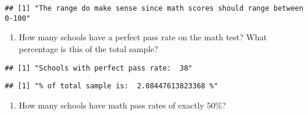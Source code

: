 \documentclass[]{article}
\newenvironment{Shaded}{\begin{snugshade}}{\end{snugshade}}
\newcommand{\KeywordTok}[1]{\textcolor[rgb]{0.13,0.29,0.53}{\textbf{#1}}}
\newcommand{\DecValTok}[1]{\textcolor[rgb]{0.00,0.00,0.81}{#1}}
\newcommand{\StringTok}[1]{\textcolor[rgb]{0.31,0.60,0.02}{#1}}
\newcommand{\OperatorTok}[1]{\textcolor[rgb]{0.81,0.36,0.00}{\textbf{#1}}}
\newcommand{\NormalTok}[1]{#1}
\providecommand{\tightlist}{%
  \setlength{\itemsep}{0pt}\setlength{\parskip}{0pt}}
\begin{document}
\begin{verbatim}
## [1] "The range do make sense since math scores should range between 0-100"
\end{verbatim}

\begin{enumerate}
\def\labelenumi{\arabic{enumi}.}
\setcounter{enumi}{1}
\tightlist
\item
  How many schools have a perfect pass rate on the math test? What
  percentage is this of the total sample?
\end{enumerate}

\begin{Shaded}
\end{Shaded}

\begin{verbatim}
## [1] "Schools with perfect pass rate:  38"
\end{verbatim}

\begin{Shaded}
\end{Shaded}

\begin{verbatim}
## [1] "% of total sample is:  2.08447613823368 %"
\end{verbatim}

\begin{enumerate}
\def\labelenumi{\arabic{enumi}.}
\setcounter{enumi}{2}
\tightlist
\item
  How many schools have math pass rates of exactly \(50\%\)?
\end{enumerate}

\begin{Shaded}
\end{Shaded}
\end{document}
